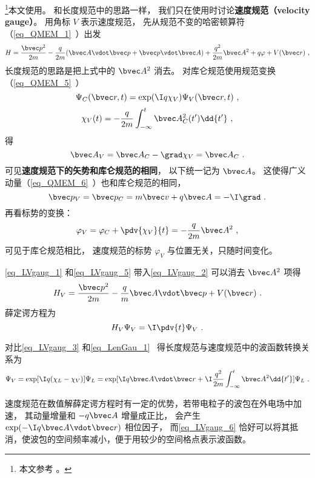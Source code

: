 

\footnote{本文参考 \cite{Bransden}。}本文使用。 和长度规范中的思路一样， 我们只在使用时讨论\textbf{速度规范（velocity gauge）}。 用角标 $V$ 表示速度规范， 先从规范不变的哈密顿算符（\autoref{eq_QMEM_1}~）出发
\begin{equation}\label{eq_LVgaug_2}
H = \frac{\bvec p^2}{2m} - \frac{q}{2m} (\bvec A \vdot \bvec p + \bvec p \vdot \bvec A)
+ \frac{q^2}{2m} \bvec A^2 + q \varphi + V(\bvec r)~,
\end{equation}
长度规范的思路是把上式中的 $\bvec A^2$ 消去。 对库仑规范使用规范变换（\autoref{eq_QMEM_5}~）
\begin{equation}\label{eq_LVgaug_3}
\Psi_C(\bvec r, t) = \exp(\I q\chi_V)\Psi_V(\bvec r, t)~,
\end{equation}
\begin{equation}\label{eq_LVgaug_4}
\chi_V(t) = -\frac{q}{2m} \int_{-\infty}^t \bvec A_C^2(t') \dd{t'}~,
\end{equation}
得
\begin{equation}\label{eq_LVgaug_1}
\bvec A_V = \bvec A_C - \grad \chi_V = \bvec A_C~.
\end{equation}
可见\textbf{速度规范下的矢势和库仑规范的相同}， 以下统一记为 $\bvec A$。 这使得广义动量（\autoref{eq_QMEM_6}~）也和库仑规范的相同， 
\begin{equation}
\bvec p_V = \bvec p_C =  m \bvec v + q\bvec A = -\I \grad~.
\end{equation}
再看标势的变换：
\begin{equation}\label{eq_LVgaug_5}
\varphi_V = \varphi_C + \pdv{\chi_V}{t} = - \frac{q}{2m} \bvec A^2~,
\end{equation}
可见于库仑规范相比， 速度规范的标势 $\varphi_V$ 与位置无关，只随时间变化。

\autoref{eq_LVgaug_1} 和\autoref{eq_LVgaug_5} 带入\autoref{eq_LVgaug_2} 可以消去 $\bvec A^2$ 项得
\begin{equation}
H_V = \frac{\bvec p^2}{2m} - \frac{q}{m} \bvec A \vdot \bvec p + V(\bvec r)~.
\end{equation}
薛定谔方程为
\begin{equation}\label{eq_LVgaug_7}
H_V \Psi_V = \I \pdv{t} \Psi_V~.
\end{equation}


对比\autoref{eq_LVgaug_3} 和\autoref{eq_LenGau_1}~ 得长度规范与速度规范中的波函数转换关系为
\begin{equation}\label{eq_LVgaug_6}
\Psi_V = \exp[\I q(\chi_L - \chi_V)]\Psi_L = \exp[\I q \bvec A\vdot \bvec r + \I\frac{q^2}{2m}\int_{-\infty}^t \bvec A^2\dd{t'}] \Psi_L~.
\end{equation}

速度规范在数值解薛定谔方程时有一定的优势，若带电粒子的波包在外电场中加速， 其动量增量和 $-q\bvec A$ 增量成正比， 会产生 $\exp(-\I q\bvec A\vdot\bvec r)$ 相位因子， 而\autoref{eq_LVgaug_6} 恰好可以将其抵消，使波包的空间频率减小，便于用较少的空间格点表示波函数。
